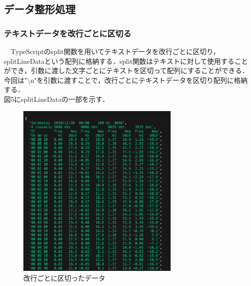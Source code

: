 \subsection{データ整形処理}
 \subsubsection{テキストデータを改行ごとに区切る}
　TypeScriptのsplit関数を用いてテキストデータを改行ごとに区切り，splitLineDataという配列に格納する．split関数はテキストに対して使用することができ，引数に渡した文字ごとにテキストを区切って配列にすることができる．今回は"\textbackslash n"を引数に渡すことで，改行ごとにテキストデータを区切り配列に格納する．\\
 図5にsplitLineDataの一部を示す．\\
 \begin{figure}[ht]
   \centering
   \label{fig:my_label}
   \includegraphics[width=80mm]{fig/splitLineData.png}
    \caption{改行ごとに区切ったデータ}
 \end{figure}
 

